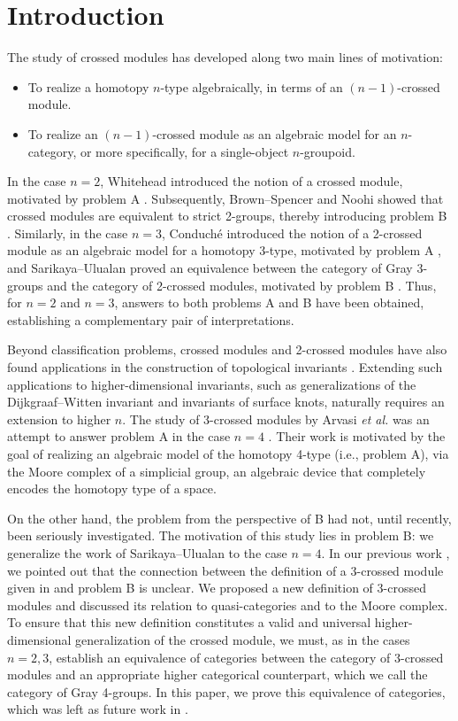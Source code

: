 \documentclass[11pt, reqno]{amsart} %
\theoremstyle{definition}
\theoremstyle{remark}
\numberwithin{equation}{section}
\begin{document}
\section{Introduction} \label{sec:Introduction}
The study of crossed modules has developed along two main lines of motivation:
\begin{itemize}
  \item [A.] To realize a homotopy $n$-type algebraically, in terms of an $(n-1)$-crossed module.
  \item [B.] To realize an $(n-1)$-crossed module as an algebraic model for an $n$-category, or more specifically, for a single-object $n$-groupoid.
\end{itemize}
In the case $n=2$, Whitehead introduced the notion of a crossed module, motivated by problem A \cite{Whitehead:1949}. Subsequently, Brown--Spencer and Noohi showed that crossed modules are equivalent to strict 2-groups, thereby introducing problem B \cite{Brown:1976}. Similarly, in the case $n=3$, Conduch\'e introduced the notion of a 2-crossed module as an algebraic model for a homotopy 3-type, motivated by problem A \cite{Conduche:1984}, and Sarikaya--Ulualan proved an equivalence between the category of Gray 3-groups and the category of 2-crossed modules, motivated by problem B \cite{Sarikaya:2024}. Thus, for $n=2$ and $n=3$, answers to both problems A and B have been obtained, establishing a complementary pair of interpretations.

Beyond classification problems, crossed modules and 2-crossed modules have also found applications in the construction of topological invariants \cite{MartinsPorter2007,MartinsPicken2013arXiv,Radenkovic:2022qkd}. Extending such applications to higher-dimensional invariants, such as generalizations of the Dijkgraaf--Witten invariant and invariants of surface knots, naturally requires an extension to higher $n$. The study of 3-crossed modules by Arvasi \textit{et al.} was an attempt to answer problem A in the case $n=4$ \cite{Arvasi:2009}. Their work is motivated by the goal of realizing an algebraic model of the homotopy 4-type (i.e., problem A), via the Moore complex of a simplicial group, an algebraic device that completely encodes the homotopy type of a space. 

On the other hand, the problem from the perspective of B had not, until recently, been seriously investigated. The motivation of this study lies in problem B: we generalize the work of Sarikaya--Ulualan to the case $n=4$. In our previous work \cite{Fukuda:2025}, we pointed out that the connection between the definition of a 3-crossed module given in \cite{Arvasi:2009} and problem B is unclear. We proposed a new definition of 3-crossed modules and discussed its relation to quasi-categories and to the Moore complex. To ensure that this new definition constitutes a valid and universal higher-dimensional generalization of the crossed module, we must, as in the cases $n=2,3$, establish an equivalence of categories between the category of 3-crossed modules and an appropriate higher categorical counterpart, which we call the category of Gray 4-groups. In this paper, we prove this equivalence of categories, which was left as future work in \cite{Fukuda:2025}.
\end{document}
